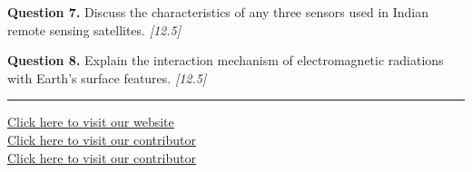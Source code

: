 \documentclass[11pt,a4paper]{article}
\newcommand{\pts}[1]{\hfill   \textit{[#1]}}
\begin{document}
\medskip


\noindent   \textbf{Question 7.} Discuss the characteristics of any three sensors used in Indian remote sensing satellites. \pts{12.5}

\medskip


\noindent   \textbf{Question 8.} Explain the interaction mechanism of electromagnetic radiations with Earth's surface features. \pts{12.5}

\vfill\rule{\linewidth}{0.4pt}

\begin{center}\small
\href{https://bhu-exam.vercel.app/}{Click here to visit our website}\\[4pt]
\href{https://me-aryan.vercel.app/}{Click here to visit our contributor}\\[4pt]
\href{https://quashan-me.vercel.app/}{Click here to visit our contributor}
\end{center}
\end{document}
